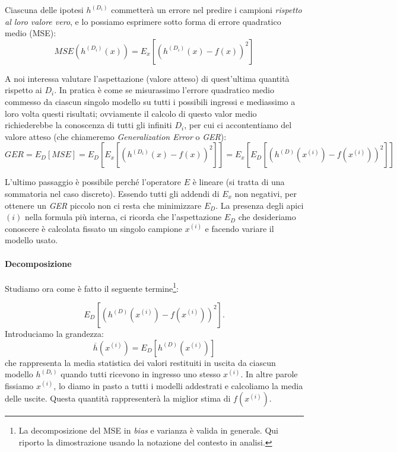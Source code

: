 Ciascuna delle ipotesi $h^{(D_i)}$ commetterà un errore nel predire i campioni \emph{rispetto al loro valore vero}, e lo possiamo esprimere sotto forma di errore quadratico medio (MSE):
\begin{equation*}
MSE\left(h^{(D_i)}(x)\right) =E_x\left[(h^{(D_i)}(x)-f(x))^2\right]
\end{equation*}

A noi interessa valutare l'aspettazione (valore atteso) di quest'ultima quantità rispetto ai $D_i$. In pratica è come se misurassimo l'errore quadratico  medio  commesso da ciascun singolo modello su tutti i possibili ingressi e mediassimo a loro volta questi risultati; ovviamente il calcolo di questo valor medio richiederebbe la conoscenza di tutti gli infiniti $D_i$, per cui ci accontentiamo del valore atteso (che chiameremo \emph{Generalization Error} o \emph{GER}):
\begin{dmath*}
GER = E_D[MSE] = E_D\left[E_x\left[\left(h^{(D_i)}(x)-f(x)\right)^2\right]\right] 
= E_x\left[E_D\left[\left(h^{(D)}(x^{(i)})-f(x^{(i)})\right)^2\right]\right]
\end{dmath*}

L'ultimo passaggio è possibile perché l'operatore $E$ è lineare (si tratta di una sommatoria nel caso discreto). Essendo tutti gli addendi di $E_x$ non negativi, per ottenere un \emph{GER} piccolo non ci resta che minimizzare $E_D$. La presenza degli apici  $(i)$ nella formula più interna, ci ricorda che l'aspettazione $E_D$ che desideriamo conoscere è calcolata fissato un singolo campione $x^{(i)}$ e facendo variare il modello usato.

\paragraph{Decomposizione}
Studiamo ora come è fatto il seguente termine\footnote{La decomposizione del MSE in \emph{bias} e varianza è valida in generale. Qui riporto la dimostrazione usando la notazione del contesto in analisi.}:

\begin{equation}\label{eq-aspettazione}
E_D\left[\left(h^{(D)}(x^{(i)})-f(x^{(i)})\right)^2\right].
\end{equation}
Introduciamo la grandezza:
\begin{equation*}
\overline{h}(x^{(i)}) = E_D\left[h^{(D)}(x^{(i)})\right]
\end{equation*}
che rappresenta la media statistica dei valori restituiti in uscita da ciascun modello $h^{(D_i)}$ quando tutti ricevono in ingresso uno stesso $x^{(i)}$. In altre parole fissiamo $x^{(i)}$, lo diamo in pasto a tutti i modelli addestrati e calcoliamo la media delle uscite. Questa quantità rappresenterà la miglior stima di $f(x^{(i)})$.

